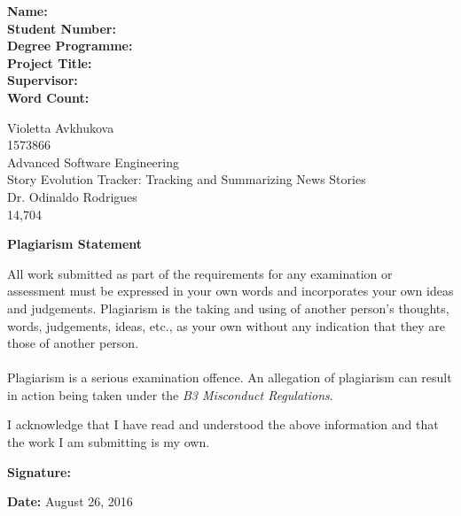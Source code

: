 \documentclass[11pt,titlepage]{report}
\begin{document}
\begin{titlepage}
\begin{minipage}{0.3\textwidth}
\begin{flushleft}
		\textbf{Name:\\Student Number:\\Degree Programme:\\Project Title:\\ Supervisor:\\ Word Count:\\}
	\end{flushleft}
\end{minipage}
\begin{minipage}{0.7\textwidth}
	\begin{flushleft}
		\doublespacing
		Violetta Avkhukova \\ 1573866 \\ Advanced Software Engineering \\ Story Evolution Tracker: Tracking and Summarizing News Stories \\ Dr. Odinaldo Rodrigues \\ 14,704
	\end{flushleft}
\end{minipage}
\begin{minipage}{\textwidth}
	\vspace{1.5cm}
	\begin{framed}
		\begin{center}
			\textbf{Plagiarism Statement}
		\end{center}
		All work submitted as part of the requirements for any examination or assessment must be expressed in your own words and incorporates your own ideas and judgements. Plagiarism is the taking and using of another person’s thoughts, words, judgements, ideas, etc., as your own without any indication that they are those of another person. \\ \\
		Plagiarism is a serious examination offence. An allegation of plagiarism can result in action being taken under the \textit{B3 Misconduct Regulations}. 
	\end{framed}
\end{minipage}
\begin{flushleft}
	I acknowledge that I have read and understood the above information and that the work I am submitting is my own. 
\end{flushleft}
\begin{minipage}{0.5\textwidth}
	\vspace{2cm}
	\begin{flushleft}
		\textbf{Signature:}
	\end{flushleft}
\end{minipage}
\begin{minipage}{0.5\textwidth}
	\vspace{2cm}
	\begin{flushleft}
		\textbf{Date:} August 26, 2016
	\end{flushleft}
\end{minipage}
\end{titlepage}
\end{document}
